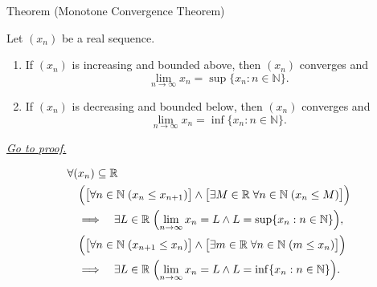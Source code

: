 
\begin{theorembox}{Theorem (Monotone Convergence Theorem)}
\begin{theorem}
\label{thm:monotone-convergence-theorem}
Let $(x_n)$ be a real sequence.
\begin{enumerate}[label=(\alph*)]
  \item If $(x_n)$ is increasing and bounded above, then $(x_n)$ converges and
  \[
    \lim_{n\to\infty}x_n=\sup\{x_n:n\in\mathbb{N}\}.
  \]
  \item If $(x_n)$ is decreasing and bounded below, then $(x_n)$ converges and
  \[
    \lim_{n\to\infty}x_n=\inf\{x_n:n\in\mathbb{N}\}.
  \]
\end{enumerate}

\smallskip
\noindent
\hyperref[prf:monotone-convergence-theorem]{\textit{Go to proof.}}
\end{theorem}
\end{theorembox}

\begin{remark*}
\[
\begin{aligned}
&\forall (x_n)\subseteq\mathbb{R}\\
&\quad
\Bigl(
  \bigl[\forall n\in\mathbb{N}\;(x_n\le x_{n+1})\bigr]
  \land
  \bigl[\exists M\in\mathbb{R}\;\forall n\in\mathbb{N}\;(x_n\le M)\bigr]
\Bigr)\\
&\quad\Longrightarrow\quad
\exists L\in\mathbb{R}\;\Bigl(
  \lim_{n\to\infty}x_n=L
  \land
  L=\sup\{x_n:n\in\mathbb{N}\}
\Bigr),\\
&\quad
\Bigl(
  \bigl[\forall n\in\mathbb{N}\;(x_{n+1}\le x_n)\bigr]
  \land
  \bigl[\exists m\in\mathbb{R}\;\forall n\in\mathbb{N}\;(m\le x_n)\bigr]
\Bigr)\\
&\quad\Longrightarrow\quad
\exists L\in\mathbb{R}\;\Bigl(
  \lim_{n\to\infty}x_n=L
  \land
  L=\inf\{x_n:n\in\mathbb{N}\}
\Bigr).
\end{aligned}
\]
\end{remark*}

